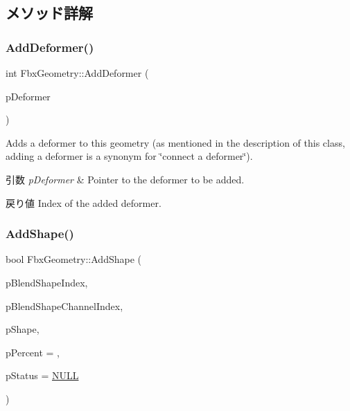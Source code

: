 \subsection{メソッド詳解}
\mbox{\label{class_fbx_geometry_a2f7e48a2faaf3893bc28eb8b684da908}} 
\subsubsection{\texorpdfstring{Add\+Deformer()}{AddDeformer()}}
{\footnotesize\ttfamily int Fbx\+Geometry\+::\+Add\+Deformer (\begin{DoxyParamCaption}\item[{\hyperlink{class_fbx_deformer}{Fbx\+Deformer} $\ast$}]{p\+Deformer }\end{DoxyParamCaption})}

Adds a deformer to this geometry (as mentioned in the description of this class, adding a deformer is a synonym for \char`\"{}connect a deformer\char`\"{}). 
\begin{DoxyParams}{引数}
{\em p\+Deformer} & Pointer to the deformer to be added. \\
\hline
\end{DoxyParams}
\begin{DoxyReturn}{戻り値}
Index of the added deformer. 
\end{DoxyReturn}
\mbox{\label{class_fbx_geometry_a4b9464c1f35f6bad8f2f19e427e70c9f}} 
\subsubsection{\texorpdfstring{Add\+Shape()}{AddShape()}}
{\footnotesize\ttfamily bool Fbx\+Geometry\+::\+Add\+Shape (\begin{DoxyParamCaption}\item[{int}]{p\+Blend\+Shape\+Index,  }\item[{int}]{p\+Blend\+Shape\+Channel\+Index,  }\item[{\hyperlink{class_fbx_shape}{Fbx\+Shape} $\ast$}]{p\+Shape,  }\item[{double}]{p\+Percent = {},  }\item[{\hyperlink{class_fbx_status}{Fbx\+Status} $\ast$}]{p\+Status = {\ttfamily \hyperlink{fbxarch_8h_a070d2ce7b6bb7e5c05602aa8c308d0c4}{N\+U\+LL}} }\end{DoxyParamCaption})}

